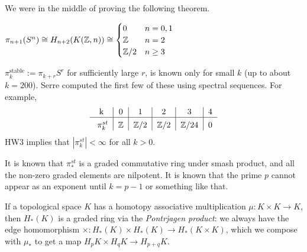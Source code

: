 
We were in the middle of proving the following theorem.
\begin{theorem}[Serre]
 $\pi_{n+1}(S^n)\cong H_{n+2}(K(\mathbb{Z},n))\cong
 \begin{cases}
  0 & n=0,1\\
  \mathbb{Z} & n=2\\
  \mathbb{Z}/2 & n\ge 3
 \end{cases}$
\end{theorem}
\begin{remark}
 $\pi_k^{\text{stable}}:=\pi_{k+r}{S^r}$ for sufficiently large $r$, is known only for small $k$ (up to about $k=200$). Serre computed the first few of these using spectral sequences. For example,
 \[\begin{tabular}{c|c|c|c|c|c}
  k & 0&1&2&3&4\\ \hline
  \rule{0pt}{12pt} $\pi_k^{st}$& $\ZZ$&$\ZZ/2$ & $\ZZ/2$ & $\ZZ/24$ & 0
 \end{tabular}\]
 HW3 implies that $|\pi_k^{st}|<\infty$ for all $k>0$.
 
 It is known that $\pi_*^{st}$ is a graded commutative ring under smash product, and all the non-zero graded elements are nilpotent. It is known that the prime $p$ cannot appear as an exponent until $k=p-1$ or something like that.
\end{remark}
\begin{definition}
 If a topological space $K$ has a homotopy associative multiplication $\mu\colon K\times K\to K$, then $H_*(K)$ is a graded ring via the \emph{Pontrjagen product}: we always have the edge homomorphism $\times\colon H_*(K)\times H_*(K)\to H_*(K\times K)$, which we compose with $\mu_*$ to get a map $H_pK\times H_qK\to H_{p+q}K$.
\end{definition}
